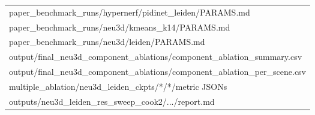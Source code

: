 \documentclass[10pt]{article}
\begin{document}
\begin{longtable}{p{15cm}}
paper\_benchmark\_runs/hypernerf/pidinet\_leiden/PARAMS.md \\
paper\_benchmark\_runs/neu3d/kmeans\_k14/PARAMS.md \\
paper\_benchmark\_runs/neu3d/leiden/PARAMS.md \\
output/final\_neu3d\_component\_ablations/component\_ablation\_summary.csv \\
output/final\_neu3d\_component\_ablations/component\_ablation\_per\_scene.csv \\
multiple\_ablation/neu3d\_leiden\_ckpts/*/*/metric JSONs \\
outputs/neu3d\_leiden\_res\_sweep\_cook2/.../report.md \\
\bottomrule
\end{longtable}
\normalsize
\end{document}
